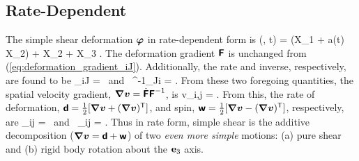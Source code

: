\subsection{Rate-Dependent}
The simple shear deformation $\mbox{\boldmath $\varphi$}$ in rate-dependent form is
\be
\vvarphi(\vX, t) = (X_1 + a(t) X_2) \; \veone + X_2 \; \vetwo + X_3 \; \vethree.
\ee
The deformation gradient $\mbox{\sffamily\bfseries F}$ is unchanged from 
(\ref{eq:deformation_gradient_iJ}).  Additionally, the rate and inverse, 
respectively, are found to be
\be
\dot{\tF}_{iJ} = 
\;\;\mbox{ and }\;\;
\tF^{-1}_{Ji} = 
.
\ee
From these two foregoing quantities, the spatial velocity gradient, 
$\mbox{\boldmath $\nabla$} \mbox{\boldmath $v$} = \dot{\mbox{\sffamily\bfseries F}} \mbox{\sffamily\bfseries F}^{-1}$, is
\be
v_{i,j} = 
.
\ee
From this, the rate of deformation, 
$\mbox{\sffamily\bfseries d} = \frac{1}{2}[\mbox{\boldmath $\nabla$} \mbox{\boldmath $v$} + (\mbox{\boldmath $\nabla$} \mbox{\boldmath $v$})^{\mbox{\scriptsize \sffamily T}}]$, 
and spin, 
$\mbox{\sffamily\bfseries w} = \frac{1}{2}[\mbox{\boldmath $\nabla$} \mbox{\boldmath $v$} - (\mbox{\boldmath $\nabla$} \mbox{\boldmath $v$})^{\mbox{\scriptsize \sffamily T}}]$, 
respectively, are
\be
\td_{ij} = 
\;\;\mbox{ and }\;\;
\tw_{ij} = 
.
\ee
Thus in rate form, 
simple shear is the 
additive decomposition 
($\mbox{\boldmath $\nabla$} \mbox{\boldmath $v$} = \mbox{\sffamily\bfseries d} + \mbox{\sffamily\bfseries w}$) of
two {\em even more simple} 
motions: (a)  pure shear and (b) rigid body 
rotation about the $\mathbf{e}_3$ axis.

